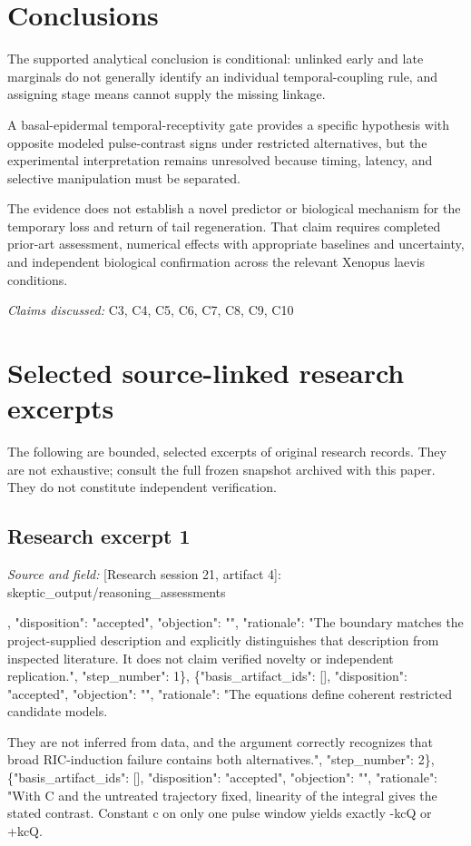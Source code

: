 \documentclass[11pt]{article}
\begin{document}
\section{Conclusions}
The supported analytical conclusion is conditional: unlinked early and late marginals do not generally identify an individual temporal-coupling rule, and assigning stage means cannot supply the missing linkage.

A basal-epidermal temporal-receptivity gate provides a specific hypothesis with opposite modeled pulse-contrast signs under restricted alternatives, but the experimental interpretation remains unresolved because timing, latency, and selective manipulation must be separated.

The evidence does not establish a novel predictor or biological mechanism for the temporary loss and return of tail regeneration. That claim requires completed prior-art assessment, numerical effects with appropriate baselines and uncertainty, and independent biological confirmation across the relevant Xenopus laevis conditions.

\textit{Claims discussed: }C3, C4, C5, C6, C7, C8, C9, C10
\appendix
\section{Selected source-linked research excerpts}
The following are bounded, selected excerpts of original research records. They are not exhaustive; consult the full frozen snapshot archived with this paper. They do not constitute independent verification.
\subsection{Research excerpt 1}
\textit{Source and field: }[Research session 21, artifact 4]: skeptic\_output/reasoning\_assessments\par
[\{"basis\_artifact\_ids": [], "disposition": "accepted", "objection": "", "rationale": "The boundary matches the project-supplied description and explicitly distinguishes that description from inspected literature. It does not claim verified novelty or independent replication.", "step\_number": 1\}, \{"basis\_artifact\_ids": [], "disposition": "accepted", "objection": "", "rationale": "The equations define coherent restricted candidate models.

They are not inferred from data, and the argument correctly recognizes that broad RIC-induction failure contains both alternatives.", "step\_number": 2\}, \{"basis\_artifact\_ids": [], "disposition": "accepted", "objection": "", "rationale": "With C and the untreated trajectory fixed, linearity of the integral gives the stated contrast. Constant c on only one pulse window yields exactly -kcQ or +kcQ.
\end{document}
